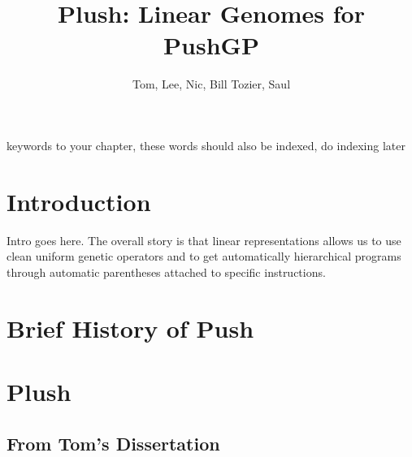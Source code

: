 %

\title*{Plush: Linear Genomes for PushGP}
\author{Tom, Lee, Nic, Bill Tozier, Saul}

\maketitle


\begin{keywords}
keywords to your chapter, these words should also be indexed, do indexing later
\end{keywords}

\section{Introduction}
\label{Introduction}

Intro goes here. The overall story is that linear representations allows us to use clean uniform genetic operators and to get automatically hierarchical programs through automatic parentheses attached to specific instructions.



\section{Brief History of Push}



\section{Plush}


\subsection{From Tom's Dissertation}

